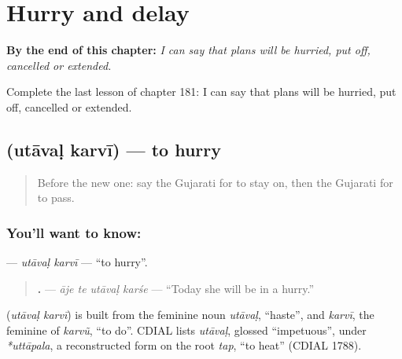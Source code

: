 
\chapter{Hurry and delay}
\label{ch:gu-hurry-and-delay}

\begin{chapteropening}
\textbf{By the end of this chapter:} \emph{I can say that plans will be hurried, put off, cancelled or extended.}

Complete the last lesson of chapter 181: I can say that plans will be hurried, put off, cancelled or extended.
\end{chapteropening}

\section[\texorpdfstring{\gu{ઉતાવળ} \gu{કરવી} (utāvaḷ karvī)}{ઉતાવળ કરવી (utāvaḷ karvī)}]{  (utāvaḷ karvī) — to hurry}

\label{lesson:GU-C181-utaval-karvi}



\begin{quote}
Before the new one: say the Gujarati for to stay on, then the Gujarati for to pass.
\end{quote}

\subsection*{You'll want to know:  }
\textbf{ } — \emph{utāvaḷ karvī} — \textquotedblleft{}to hurry\textquotedblright{}.

\begin{quote}
\textbf{   .} — \emph{āje te utāvaḷ karśe} — \textquotedblleft{}Today she will be in a hurry.\textquotedblright{}
\end{quote}

\begin{cousinweb}
\textbf{ } (\emph{utāvaḷ karvī}) is built from the feminine noun \emph{utāvaḷ}, \textquotedblleft{}haste\textquotedblright{}, and \emph{karvī}, the feminine of \emph{karvũ}, \textquotedblleft{}to do\textquotedblright{}. CDIAL lists \emph{utāvaḷ}, glossed \textquotedblleft{}impetuous\textquotedblright{}, under \emph{*uttāpala}, a reconstructed form on the root \emph{tap}, \textquotedblleft{}to heat\textquotedblright{} (CDIAL 1788).
\end{cousinweb}


